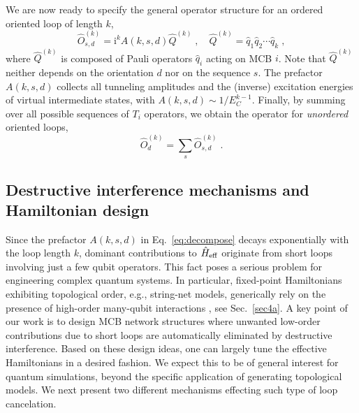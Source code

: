 \documentclass[twocolumn,floats,prx,showpacs]{revtex4-1}
\begin{document}
We are now ready to specify the general operator structure for an ordered oriented loop of length $k$, 
\begin{equation}\label{eq:decompose}
\hat O^{(k)}_{s,d}= \mathrm i^k  A(k,s,d) \hat Q^{(k)} \;,
\quad \hat Q^{(k)}=\hat q_1 \hat q_2 \cdots \hat q_k\;,
\end{equation}
where $\hat Q^{(k)}$ is composed of Pauli operators $\hat q_i$ acting on MCB $i$. Note that $\hat Q^{(k)}$ 
neither depends on the orientation $d$ nor on the sequence $s$. The 
prefactor $A(k,s,d)$ collects all tunneling amplitudes and the (inverse) excitation energies of virtual intermediate states, with $A(k,s,d)\sim  1/E_C^{k-1}$.  Finally, by summing over all possible sequences of $T_i$ operators, we obtain the operator for \emph{unordered} oriented loops,
\begin{equation}
\hat O^{(k)}_d = \sum_{s} \hat O^{(k)}_{s,d} \;. \label{eq:unordered}
\end{equation}

\subsection{Destructive interference mechanisms and Hamiltonian design} \label{sec2e}

Since the prefactor $A(k,s,d)$ in Eq.~\eqref{eq:decompose} decays exponentially with the loop length $k$, dominant contributions to $\hat H_{\rm eff}$ 
originate from short loops involving just a few qubit operators.
This fact poses a serious problem for engineering complex quantum systems. In particular, fixed-point Hamiltonians exhibiting topological order, e.g., string-net models, generically rely on the presence of high-order many-qubit interactions \cite{Levin2005,Fidkowski2009,Wen2017}, see Sec.~\ref{sec4a}. A key point of our work is to design MCB network structures where unwanted low-order contributions due to short loops are automatically eliminated by destructive interference.  
Based on these design ideas, one can largely tune the effective Hamiltonians in a desired fashion. We expect this to be of general interest for quantum simulations, beyond the specific application of generating topological models.
We next present two different mechanisms effecting such type of loop cancelation.
\end{document}
